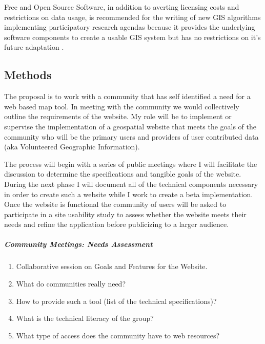 \documentclass[12pt,letterpaper]{article}
\begin{document}
	Free and Open Source Software, in addition to averting licensing costs and restrictions on data usage, is recommended for the writing of new GIS algorithms implementing participatory research agendas because it provides the underlying software components to create a usable GIS system but has no restrictions on it's future adaptation \parencite{Dunn2007}.

\subsection{Methods}
	The proposal is to work with a community that has self identified a need for a web based map tool. In meeting with the community we would collectively outline the requirements of the website. My role will be to implement or supervise the implementation of a geospatial website that meets the goals of the community who will be the primary users and providers of user contributed data (aka Volunteered Geographic Information).
	
	The process will begin with a series of public meetings where I will facilitate the discussion to determine the specifications and tangible goals of the website. During the next phase I will document all of the technical components necessary in order to create such a website while I work to create a beta implementation. Once the website is functional the community of users will be asked to participate in a site usability study to assess whether the website meets their needs and refine the application before publicizing to a larger audience.

\subparagraph*{Community Meetings: Needs Assessment}
\begin{enumerate}
	\item Collaborative session on Goals and Features for the Website.
	\item What do communities really need?
	\item How to provide such a tool (list of the technical specifications)?
	\item What is the technical literacy of the group?
	\item What type of access does the community have to web resources?
\end{enumerate}
\end{document}
